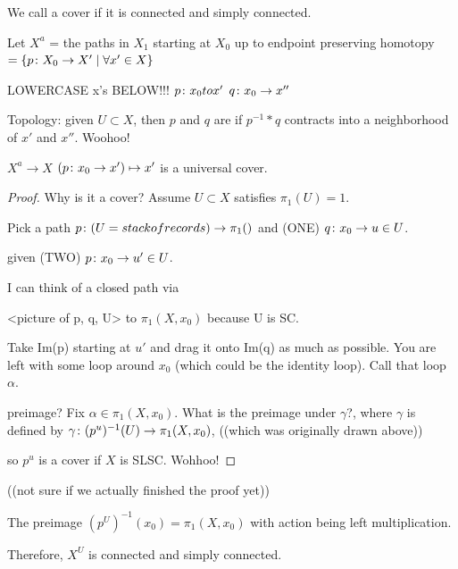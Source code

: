 \documentclass[11pt,leqno,oneside]{amsart}
\newenvironment{dateenv}{
  \vspace{1em}
}{
  \vspace{1em}
}
\newcommand{\mydate}[4]{
  \newdate{#1}{#2}{#3}{#4}
  \begin{dateenv}
    \hfill\displaydate{#1}
  \end{dateenv}
}
\numberwithin{thm}{section}
\newcommand{\fund}[1][1]{\pi_{#1}}
\begin{document}
\begin{defn}
  We call a cover  if it is connected and simply connected.
\end{defn}

Let $X^a$ = {the paths in $X_1$ starting at $X_0$ up to endpoint preserving homotopy }
$= \{ p \colon X_0 \to X' \mid \forall x' \in X \}$

LOWERCASE x's BELOW!!!
$p \colon x_0 to x'$
$q \colon x_0 \to x''$

\begin{defn}
  Topology: given $U \subset X$, then $p$ and $q$ are  if $p^{-1}*q$ contracts into a neighborhood of $x'$ and $x''$.  Woohoo!
\end{defn}

\begin{thm}
  $X^a \to X$
  $(p \colon x_0 \to x') \mapsto x'$
  is a universal cover.
\end{thm}
\begin{proof}
  Why is it a cover?  Assume $U \subset X$ satisfies $\fund(U) = 1$.

  Pick a path $p \from (U = stack of records) \to \fund()$ and (ONE) $q \colon x_0 \to u \in U$.

  given (TWO) $p \colon x_0 \to u' \in U$.

  I can think of a closed path via

  <picture of p, q, U> to $\fund(X, x_0)$
  because U is SC.

  Take Im(p) starting at $u'$ and drag it onto Im(q) as much as possible.  You are left with some loop around $x_0$ (which could be the identity loop).  Call that loop $\alpha$.

  preimage?  Fix $\alpha \in \fund(X, x_0)$.  What is the preimage under $\gamma$?, where $\gamma$ is defined by $\gamma \from (p^u)^{-1}(U) \to \fund(X, x_0)$, ((which was originally drawn above))

  so $p^u$ is a cover if $X$ is SLSC.  Wohhoo!
\end{proof}
((not sure if we actually finished the proof yet))

The preimage $(p^U)^{-1}(x_0) = \fund(X, x_0)$ with action being left multiplication.

Therefore, $X^U$ is connected and simply connected.

\mydate{d6}{3}{2}{2017}
\end{document}
